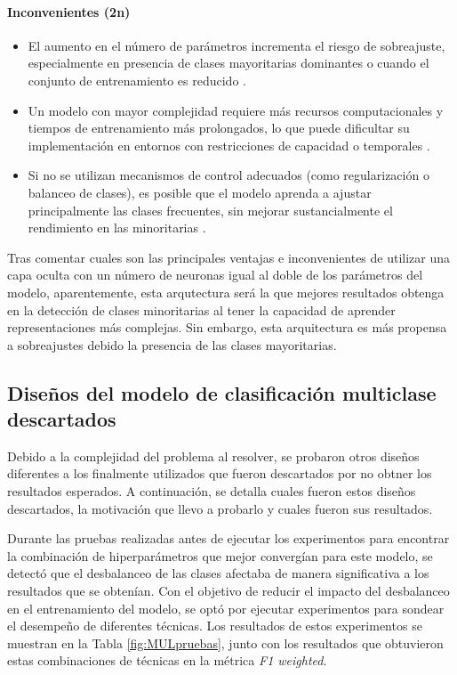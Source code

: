 \paragraph{Inconvenientes (2n)}
\begin{itemize}
	\item El aumento en el número de parámetros incrementa el riesgo de sobreajuste, especialmente en presencia de clases mayoritarias dominantes o cuando el conjunto de entrenamiento es reducido \cite{srivastava2014dropout}.
	\item Un modelo con mayor complejidad requiere más recursos computacionales y tiempos de entrenamiento más prolongados, lo que puede dificultar su implementación en entornos con restricciones de capacidad o temporales \cite{han2015deep}.
	\item Si no se utilizan mecanismos de control adecuados (como regularización o balanceo de clases), es posible que el modelo aprenda a ajustar principalmente las clases frecuentes, sin mejorar sustancialmente el rendimiento en las minoritarias \cite{chawla2002smote}.

\end{itemize}

Tras comentar cuales son las principales ventajas e inconvenientes de utilizar una capa oculta con un número de neuronas igual al doble de los parámetros del modelo, aparentemente, esta arqutectura será la que mejores resultados obtenga en la detección de clases minoritarias al tener la capacidad de aprender representaciones más complejas. Sin embargo, esta arquitectura es más propensa a sobreajustes debido la presencia de las clases mayoritarias.

\subsection{Diseños del modelo de clasificación multiclase descartados} \label{subsec:MCMdescart}

Debido a la complejidad del problema al resolver, se probaron otros diseños diferentes a los finalmente utilizados que fueron descartados por no obtner los resultados esperados. A continuación, se detalla cuales fueron estos diseños descartados, la motivación que llevo a probarlo y cuales fueron sus resultados.

Durante las pruebas realizadas antes de ejecutar los experimentos para encontrar la combinación de hiperparámetros que mejor convergían para este modelo, se detectó que el desbalanceo de las clases afectaba de manera significativa a los resultados que se obtenían. Con el objetivo de reducir el impacto del desbalanceo en el entrenamiento del modelo, se optó por ejecutar experimentos para sondear el desempeño de diferentes técnicas. Los resultados de estos experimentos se muestran en la Tabla  \ref{fig:MULpruebas}, junto con los resultados que obtuvieron estas combinaciones de técnicas en la métrica \textit{F1 weighted}.


